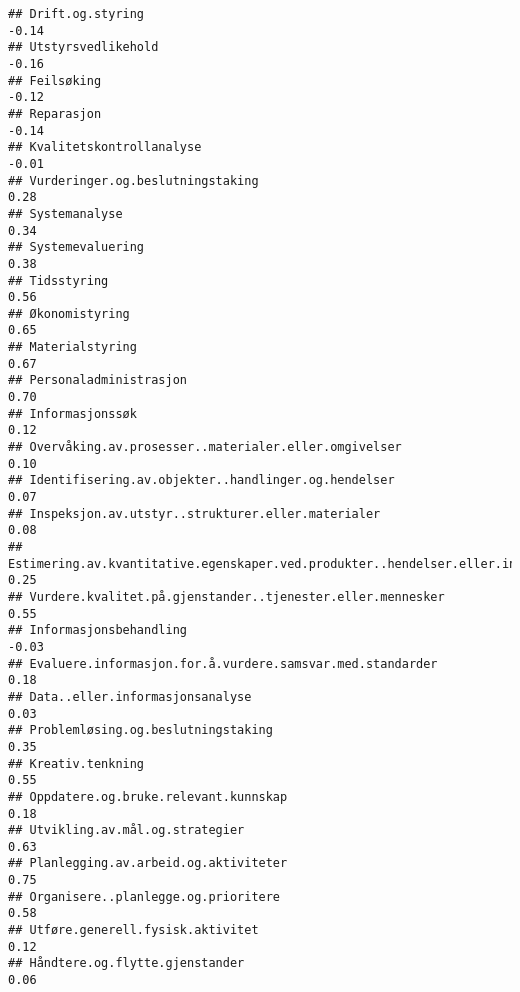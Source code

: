 \documentclass[
]{article}
\begin{document}
\begin{verbatim}
## Drift.og.styring                                                                 -0.14
## Utstyrsvedlikehold                                                               -0.16
## Feilsøking                                                                       -0.12
## Reparasjon                                                                       -0.14
## Kvalitetskontrollanalyse                                                         -0.01
## Vurderinger.og.beslutningstaking                                                  0.28
## Systemanalyse                                                                     0.34
## Systemevaluering                                                                  0.38
## Tidsstyring                                                                       0.56
## Økonomistyring                                                                    0.65
## Materialstyring                                                                   0.67
## Personaladministrasjon                                                            0.70
## Informasjonssøk                                                                   0.12
## Overvåking.av.prosesser..materialer.eller.omgivelser                              0.10
## Identifisering.av.objekter..handlinger.og.hendelser                               0.07
## Inspeksjon.av.utstyr..strukturer.eller.materialer                                 0.08
## Estimering.av.kvantitative.egenskaper.ved.produkter..hendelser.eller.informasjon  0.25
## Vurdere.kvalitet.på.gjenstander..tjenester.eller.mennesker                        0.55
## Informasjonsbehandling                                                           -0.03
## Evaluere.informasjon.for.å.vurdere.samsvar.med.standarder                         0.18
## Data..eller.informasjonsanalyse                                                   0.03
## Problemløsing.og.beslutningstaking                                                0.35
## Kreativ.tenkning                                                                  0.55
## Oppdatere.og.bruke.relevant.kunnskap                                              0.18
## Utvikling.av.mål.og.strategier                                                    0.63
## Planlegging.av.arbeid.og.aktiviteter                                              0.75
## Organisere..planlegge.og.prioritere                                               0.58
## Utføre.generell.fysisk.aktivitet                                                  0.12
## Håndtere.og.flytte.gjenstander                                                    0.06

\end{verbatim}
\end{document}
